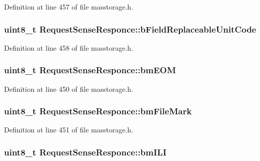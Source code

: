 \-Definition at line 457 of file masstorage.\-h.

\hypertarget{struct_request_sense_responce_ada14013a7a12b33b5d1ed747a48d5fe0}{
\subsubsection[{b\-Field\-Replaceable\-Unit\-Code}]{\setlength{\rightskip}{0pt plus 5cm}uint8\-\_\-t {\bf \-Request\-Sense\-Responce\-::b\-Field\-Replaceable\-Unit\-Code}}}\label{struct_request_sense_responce_ada14013a7a12b33b5d1ed747a48d5fe0}


\-Definition at line 458 of file masstorage.\-h.

\hypertarget{struct_request_sense_responce_a72c82a54965c687da13f217753f18f7d}{
\subsubsection[{bm\-E\-O\-M}]{\setlength{\rightskip}{0pt plus 5cm}uint8\-\_\-t {\bf \-Request\-Sense\-Responce\-::bm\-E\-O\-M}}}\label{struct_request_sense_responce_a72c82a54965c687da13f217753f18f7d}


\-Definition at line 450 of file masstorage.\-h.

\hypertarget{struct_request_sense_responce_a7255f887c70660d714500b4131f7ab23}{
\subsubsection[{bm\-File\-Mark}]{\setlength{\rightskip}{0pt plus 5cm}uint8\-\_\-t {\bf \-Request\-Sense\-Responce\-::bm\-File\-Mark}}}\label{struct_request_sense_responce_a7255f887c70660d714500b4131f7ab23}


\-Definition at line 451 of file masstorage.\-h.

\hypertarget{struct_request_sense_responce_ae14c0df03bdb15da04b4db655a5a9b66}{
\subsubsection[{bm\-I\-L\-I}]{\setlength{\rightskip}{0pt plus 5cm}uint8\-\_\-t {\bf \-Request\-Sense\-Responce\-::bm\-I\-L\-I}}}\label{struct_request_sense_responce_ae14c0df03bdb15da04b4db655a5a9b66}


